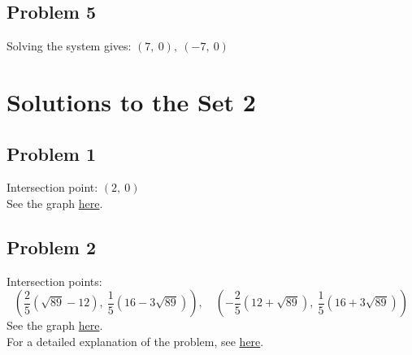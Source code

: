 \documentclass[12pt]{article}
\begin{document}
\subsection*{Problem 5}
Solving the system gives:
\(
\boxed{(7,\ 0),\ (-7,\ 0)}
\)

\section*{Solutions to the Set 2}

\subsection*{Problem 1}
Intersection point: \(\boxed{(2,\ 0)}\)\\
See the graph \href{https://www.desmos.com/calculator/uikzkxkz5e}{here}.

\subsection*{Problem 2}
Intersection points:
\[
\boxed{
\left( \frac{2}{5}(\sqrt{89} - 12),\ \frac{1}{5}(16 - 3\sqrt{89}) \right),\quad
\left( -\frac{2}{5}(12 + \sqrt{89}),\ \frac{1}{5}(16 + 3\sqrt{89}) \right)
}
\]
See the graph \href{https://www.desmos.com/calculator/ygtpvuq0w5}{here}.\\
For a detailed explanation of the problem, see \href{https://drive.google.com/file/d/1rzb7irpYOnVq8Myj90HDMKmmtU4NDS_2/view?usp=sharing}{here}.
\end{document}
